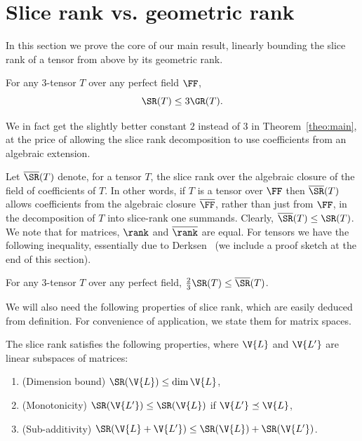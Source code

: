 \section{Slice rank vs. geometric rank}\label{sec:SR-GR}

In this section we prove the core of our main result, linearly bounding the slice rank of a tensor from above by its geometric rank.

\begin{theorem}\label{theo:main}
	For any $3$-tensor $T$ over any perfect field $\FF$,
	$$\SR(T) \le 3\GR(T).$$
\end{theorem}

We in fact get the slightly better constant $2$ instead of $3$ in Theorem~\ref{theo:main}, at the price of allowing the slice rank decomposition to use coefficients from an algebraic extension.

Let $\overline{\SR}(T)$ denote, for a tensor $T$, the slice rank over the algebraic closure of the field of coefficients of $T$. In other words, if $T$ is a tensor over $\FF$ then $\overline{\SR}(T)$ allows coefficients from the algebraic closure $\overline{\FF}$, rather than just from $\FF$, in the decomposition of $T$ into slice-rank one summands.
Clearly, $\overline{\SR}(T) \le \SR(T)$.
We note that for matrices, $\rank$ and $\overline{\rank}$ are equal. 
For tensors we have the following inequality, essentially due to Derksen~\cite{Derksen20} (we include a proof sketch at the end of this section).


\begin{proposition}\label{prop:stable-rk}
For any $3$-tensor $T$ over any perfect field,
$\frac23\SR(T) \le \overline{\SR}(T)$.
\end{proposition}




We will also need the following properties of slice rank, which are easily deduced from definition. 
For convenience of application, we state them for matrix spaces.

\begin{proposition}\label{prop:SR-properties}
The slice rank satisfies the following properties, where $\V{L}$ and $\V{L'}$ are linear subspaces of matrices:
\begin{enumerate}
	\item(Dimension bound) $\SR(\V{L}) \le \dim \V{L}$,
	\item(Monotonicity) $\SR(\V{L'}) \le \SR(\V{L})$ if $\V{L'} \preceq \V{L}$, 
	\item(Sub-additivity) $\SR(\V{L}+\V{L'}) \le \SR(\V{L})+\SR(\V{L'})$.
\end{enumerate}
\end{proposition}







